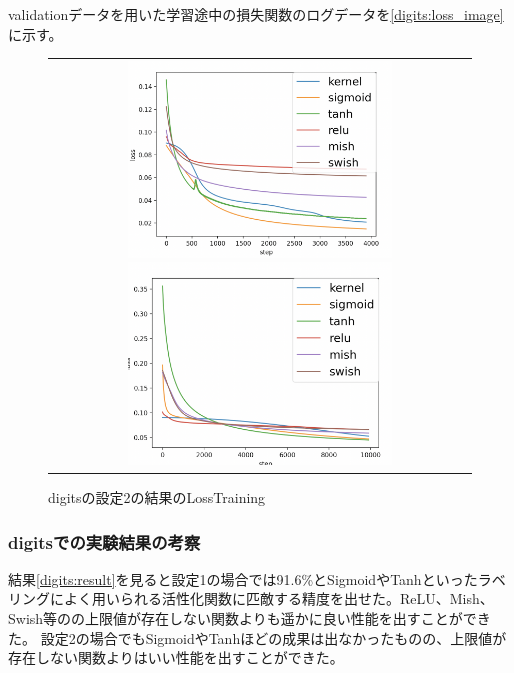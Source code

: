 validationデータを用いた学習途中の損失関数のログデータを\ref{digits:loss_image}に示す。


\begin{figure}[hbtp]
\label{digits:loss_image}
    \begin{center}
        \begin{tabular}{c}
            \begin{minipage}{0.5\hsize}
                \includegraphics[clip, width=7cm]{asset/digits_0.01_4000_3_002_sgd_non_kaiming_uniform.png}
                    \caption{digitsの設定1の結果のLossTraining}
                    \label{digits_1}
            \end{minipage}
            \hspace{10pt}
            \begin{minipage}{0.5\hsize}
                \includegraphics[clip, width=7cm]{asset/digits_0.001_10000_3_002_adam_non_kaiming_uniform.png}
                    \caption{digitsの設定2の結果のLossTraining}
                    \label{digits_2}
            \end{minipage}
        \end{tabular}
    \end{center}
\end{figure}


\subsubsection{digitsでの実験結果の考察}
結果\ref{digits:result}を見ると設定1の場合では91.6\%とSigmoidやTanhといったラベリングによく用いられる活性化関数に匹敵する精度を出せた。ReLU、Mish、Swish等のの上限値が存在しない関数よりも遥かに良い性能を出すことができた。
設定2の場合でもSigmoidやTanhほどの成果は出なかったものの、上限値が存在しない関数よりはいい性能を出すことができた。

